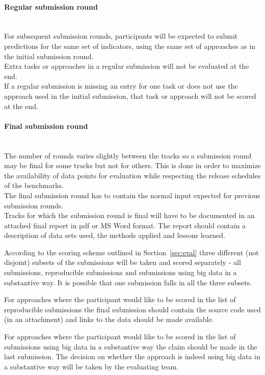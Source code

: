 \documentclass[12pt]{article}
\begin{document}
\paragraph{Regular submission round}

\textbf{ }\\
For subsequent submission rounds, participants will be expected to submit predictions for the same set of indicators, using the same set of approaches as in the initial submission round.  \\
Extra tasks or approaches in a regular submission will not be evaluated at the end.  \\
If a regular submission is missing an entry for one task or does not use the approach used in the initial submission, that task or approach will not be scored at the end. \\

\paragraph{Final submission round}

\textbf{ }\\
The number of rounds varies slightly between the tracks so a submission round may be final for some tracks but not for others. This is done in order to maximize the availability of data points for evaluation while respecting the release schedules of the benchmarks.\\
The final submission round has to contain the normal input expected for previous submission rounds.\\
Tracks for which the submission round is final will have to be documented in an attached final report in pdf or MS Word format. The report should contain a description of data sets used, the methods applied and lessons learned.

According to the scoring scheme outlined in Section~\ref{sec:eval} three different (not disjoint) subsets of the submissions will be taken and scored separately - all submissions, reproducible submissions and submissions using big data in a substantive way. It is possible that one submission falls in all the three subsets. 

For approaches where the participant would like to be scored in the list of reproducible submissions the final submission should contain the source code used (in an attachment) and links to the data should be made available.

For approaches where the participant would like to be scored in the list of submissions using big data in a substantive way the claim should be made in the last submission. The decision on whether the approach is indeed using big data in a substantive way will be taken by the evaluating team.
\end{document}
